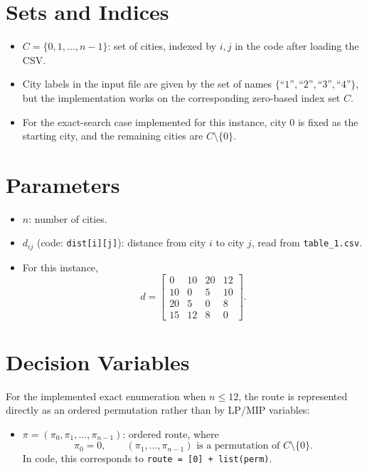 \section*{Sets and Indices}

\begin{itemize}
    \item $C = \{0,1,\dots,n-1\}$: set of cities, indexed by $i,j$ in the code after loading the CSV.
    \item City labels in the input file are given by the set of names $\{\text{``1''},\text{``2''},\text{``3''},\text{``4''}\}$, but the implementation works on the corresponding zero-based index set $C$.
    \item For the exact-search case implemented for this instance, city $0$ is fixed as the starting city, and the remaining cities are $C \setminus \{0\}$.
\end{itemize}

\section*{Parameters}

\begin{itemize}
    \item $n$: number of cities.
    \item $d_{ij}$ (code: \texttt{dist[i][j]}): distance from city $i$ to city $j$, read from \texttt{table\_1.csv}.
    \item For this instance,
    \[
    d=\begin{bmatrix}
    0 & 10 & 20 & 12\\
    10 & 0 & 5 & 10\\
    20 & 5 & 0 & 8\\
    15 & 12 & 8 & 0
    \end{bmatrix}.
    \]
\end{itemize}

\section*{Decision Variables}

For the implemented exact enumeration when $n \le 12$, the route is represented directly as an ordered permutation rather than by LP/MIP variables:

\begin{itemize}
    \item $\pi = (\pi_0,\pi_1,\dots,\pi_{n-1})$: ordered route, where
    \[
    \pi_0 = 0,
    \qquad
    (\pi_1,\dots,\pi_{n-1}) \text{ is a permutation of } C\setminus\{0\}.
    \]
    In code, this corresponds to \texttt{route = [0] + list(perm)}.
\end{itemize}

